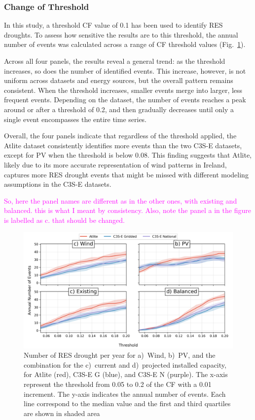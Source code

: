 \documentclass[a4paper, 11pt]{article}
\begin{document}
\newpage
\subsubsection{Change of Threshold}

In this study, a threshold CF value of 0.1 has been used to identify RES droughts. To assess how sensitive the results are to this threshold, the annual number of events was calculated across a range of CF threshold values (Fig.~\ref{fig:number_days_threshold}).

Across all four panels, the results reveal a general trend: as the threshold increases, so does the number of identified events. This increase, however, is not uniform across datasets and energy sources, but the overall pattern remains consistent. When the threshold increases, smaller events merge into larger, less frequent events. Depending on the dataset, the number of events reaches a peak around or after a threshold of 0.2, and then gradually decreases until only a single event encompasses the entire time series.

Overall, the four panels indicate that regardless of the threshold applied, the Atlite dataset consistently identifies more events than the two C3S-E datasets, except for PV when the threshold is below 0.08. This finding suggests that Atlite, likely due to its more accurate representation of wind patterns in Ireland, captures more RES drought events that might be missed with different modeling assumptions in the C3S-E datasets.

\textcolor{magenta}{So, here the panel names are different as in the other ones, with existing and balanced. this is what I meant by consistency. Also, note the panel a in the figure is labelled as c. that should be changed. }

\begin{figure}[!ht]
	\centering
	\includegraphics[width=\textwidth]{drouhgts_varying_threshold}
	\caption{Number of RES drought per year for a)~Wind, b)~PV, and the combination for the c)~current and d)~projected installed capacity, for Atlite (red), C3S-E G (blue), and C3S-E N (purple). The x-axis represent the threshold from 0.05 to 0.2 of the CF with a 0.01 increment. The y-axis indicates the annual number of events. Each line correspond to the median value and the first and third quartiles are shown in shaded area}
	\label{fig:number_days_threshold}
\end{figure}
\end{document}
